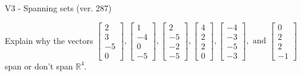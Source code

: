 \begin{exercise}
  \begin{exerciseTitle}V3 - Spanning sets (ver. 287)\end{exerciseTitle}
  \begin{exerciseStatement}
    Explain why the vectors \(\left[\begin{array}{r}
2 \\
3 \\
-5 \\
0
\end{array}\right] , \left[\begin{array}{r}
1 \\
-4 \\
0 \\
-5
\end{array}\right] , \left[\begin{array}{r}
2 \\
-5 \\
-2 \\
-5
\end{array}\right] , \left[\begin{array}{r}
4 \\
2 \\
2 \\
0
\end{array}\right] , \left[\begin{array}{r}
-4 \\
-3 \\
-5 \\
-3
\end{array}\right] , \text{ and } \left[\begin{array}{r}
0 \\
2 \\
2 \\
-1
\end{array}\right]\) span or don't span \(\mathbb{R}^4\). 
	



\end{exerciseStatement}
\end{exercise}
